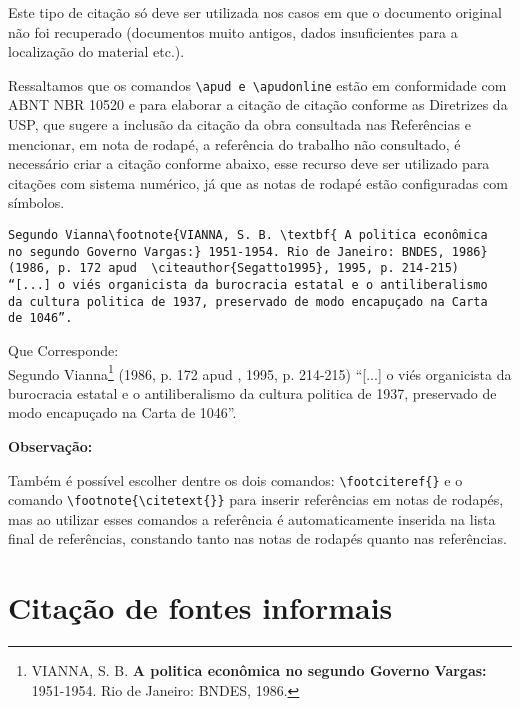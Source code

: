 Este tipo de citação só deve ser utilizada nos casos em que o documento original não foi recuperado (documentos muito antigos, dados insuficientes para a localização do material etc.).

Ressaltamos que os comandos \verb+\apud e \apudonline+ estão em conformidade com ABNT NBR 10520 e para elaborar a citação de citação conforme as Diretrizes da USP, que sugere a inclusão da citação da obra consultada nas Referências e mencionar, em nota de rodapé, a referência do trabalho não consultado, é necessário criar a citação conforme abaixo, esse recurso deve ser utilizado para citações com sistema numérico, já que as notas de rodapé estão configuradas com símbolos. 



\begin{alineas}
\item 
\begin{verbatim}
Segundo Vianna\footnote{VIANNA, S. B. \textbf{ A politica econômica 
no segundo Governo Vargas:} 1951-1954. Rio de Janeiro: BNDES, 1986}
(1986, p. 172 apud  \citeauthor{Segatto1995}, 1995, p. 214-215) 
“[...] o viés organicista da burocracia estatal e o antiliberalismo 
da cultura politica de 1937, preservado de modo encapuçado na Carta 
de 1046”.
\end{verbatim}
\end{alineas}


Que Corresponde: \\

Segundo Vianna\footnote{VIANNA, S. B.\textbf{ A politica econômica no segundo Governo Vargas:} 1951-1954. Rio de Janeiro: BNDES, 1986.} (1986, p. 172 apud \citeauthor{Segatto1995}, 1995, p. 214-215) “[...] o viés organicista da burocracia estatal e o antiliberalismo da cultura politica de 1937, preservado de modo encapuçado na Carta de 1046”.

\newpage

\textbf{Observação:}

Também é possível escolher dentre os dois comandos: \verb+\footciteref{}+ e o comando \verb+\footnote{\citetext{}}+ para inserir referências em notas de rodapés, mas ao utilizar esses comandos a referência é automaticamente inserida na lista final de referências, constando tanto nas notas de rodapés quanto nas referências.

\section{Citação de fontes informais}\label{fontecit}

